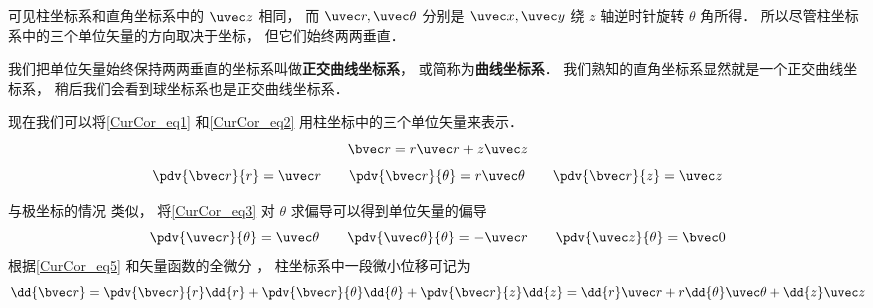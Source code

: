 可见柱坐标系和直角坐标系中的 $\uvec z$ 相同， 而 $\uvec r, \uvec \theta$ 分别是 $\uvec x, \uvec y$ 绕 $z$ 轴逆时针旋转 $\theta$ 角所得． 所以尽管柱坐标系中的三个单位矢量的方向取决于坐标， 但它们始终两两垂直．

我们把单位矢量始终保持两两垂直的坐标系叫做\textbf{正交曲线坐标系}， 或简称为\textbf{曲线坐标系}． 我们熟知的直角坐标系显然就是一个正交曲线坐标系， 稍后我们会看到球坐标系也是正交曲线坐标系．

现在我们可以将\autoref{CurCor_eq1} 和\autoref{CurCor_eq2} 用柱坐标中的三个单位矢量来表示．
\begin{equation}
\bvec r = r\uvec r + z\uvec z
\end{equation}
\begin{equation}
\pdv{\bvec r}{r} = \uvec r \qquad \pdv{\bvec r}{\theta} = r\uvec \theta \qquad \pdv{\bvec r}{z} = \uvec z\label{CurCor_eq5}
\end{equation}

与极坐标的情况 类似， 将\autoref{CurCor_eq3} 对 $\theta$ 求偏导可以得到单位矢量的偏导
\begin{equation}
\pdv{\uvec r}{\theta} = \uvec \theta \qquad
\pdv{\uvec \theta}{\theta} = -\uvec r \qquad
\pdv{\uvec z}{\theta} = \bvec 0
\end{equation}
根据\autoref{CurCor_eq5} 和矢量函数的全微分%
， 柱坐标系中一段微小位移可记为
\begin{equation}\label{CurCor_eq7}
\dd{\bvec r} = \pdv{\bvec r}{r}\dd{r} + \pdv{\bvec r}{\theta}\dd{\theta} + \pdv{\bvec r}{z}\dd{z} = \dd{r}\uvec r + r\dd{\theta} \uvec \theta + \dd{z} \uvec z
\end{equation}
